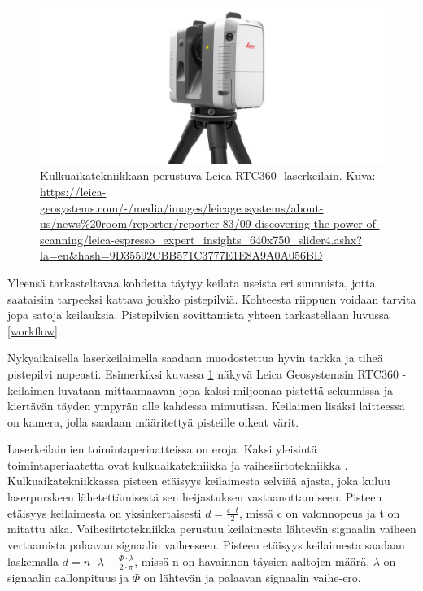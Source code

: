 \begin{figure}
    \centering
    \includegraphics[width=0.7\paperwidth]{img/leica.jpg}
    \caption{Kulkuaikatekniikkaan perustuva Leica RTC360 -laserkeilain. Kuva: \url{https://leica-geosystems.com/-/media/images/leicageosystems/about-us/news\%20room/reporter/reporter-83/09-discovering-the-power-of-scanning/leica-espresso_expert_insights_640x750_slider4.ashx?la=en&hash=9D35592CBB571C3777E1E8A9A0A056BD}}
    \label{leica}
\end{figure}

Yleensä tarkasteltavaa kohdetta täytyy keilata useista eri suunnista, jotta saataisiin tarpeeksi kattava joukko pistepilviä. Kohteesta riippuen voidaan tarvita jopa satoja keilauksia. Pistepilvien sovittamista yhteen tarkastellaan luvussa \ref{workflow}.

Nykyaikaisella laserkeilaimella saadaan muodostettua hyvin tarkka ja tiheä pistepilvi nopeasti. Esimerkiksi kuvassa \ref{leica} näkyvä Leica Geosystemsin RTC360 -keilaimen luvataan mittaamaavan jopa kaksi miljoonaa pistettä sekunnissa ja kiertävän täyden ympyrän alle kahdessa minuutissa. Keilaimen lisäksi laitteessa on kamera, jolla saadaan määritettyä pisteille oikeat värit. \cite{leica} 

Laserkeilaimien toimintaperiaatteissa on eroja. Kaksi yleisintä toimintaperiaatetta ovat kulkuaikatekniikka  ja vaihesiirtotekniikka . Kulkuaikatekniikkassa pisteen etäisyys keilaimesta selviää ajasta, joka kuluu laserpurskeen lähetettämisestä sen heijastuksen vastaanottamiseen. Pisteen etäisyys keilaimesta on yksinkertaisesti $d=\frac{c\cdot t}{2}$, missä c on valonnopeus ja t on mitattu aika. \cite{fabritius}   
Vaihesiirtotekniikka perustuu keilaimesta lähtevän signaalin vaiheen vertaamista palaavan signaalin vaiheeseen. Pisteen etäisyys keilaimesta saadaan laskemalla $d=n\cdot \lambda + \frac{\Phi \cdot \lambda}{2 \cdot \pi}$, missä n on havainnon täysien aaltojen määrä, $\lambda$ on signaalin aallonpituus ja $\Phi$ on lähtevän ja palaavan signaalin vaihe-ero. \cite{fabritius}

